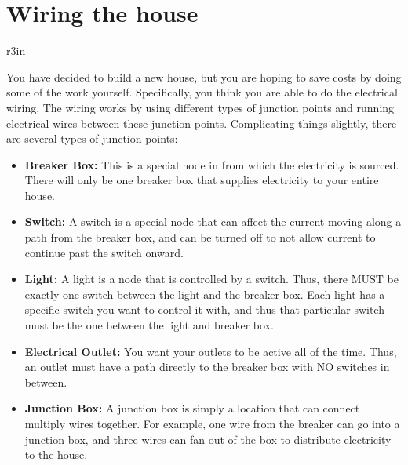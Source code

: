 \documentclass[11pt]{article}
\begin{document}
\section*{Wiring the house}


\begin{wrapfigure}{r}{3in}
\vspace{-10pt}
\vspace{-30pt}
\end{wrapfigure}

You have decided to build a new house, but you are hoping to save costs by doing some of the work yourself. Specifically, you think you are able to do the electrical wiring. The wiring works by using different types of junction points and running electrical wires between these junction points. Complicating things slightly, there are several types of junction points:

\begin{itemize}
	\item \textbf{Breaker Box:} This is a special node in from which the electricity is sourced. There will only be one breaker box that supplies electricity to your entire house.
	\item \textbf{Switch:} A switch is a special node that can affect the current moving along a path from the breaker box, and can be turned off to not allow current to continue past the switch onward.
	\item \textbf{Light:} A light is a node that is controlled by a switch. Thus, there MUST be exactly one switch between the light and the breaker box. Each light has a specific switch you want to control it with, and thus that particular switch must be the one between the light and breaker box.
	\item \textbf{Electrical Outlet:} You want your outlets to be active all of the time. Thus, an outlet must have a path directly to the breaker box with NO switches in between.
	\item \textbf{Junction Box:} A junction box is simply a location that can connect multiply wires together. For example, one wire from the breaker can go into a junction box, and three wires can fan out of the box to distribute electricity to the house.
\end{itemize}
\end{document}
